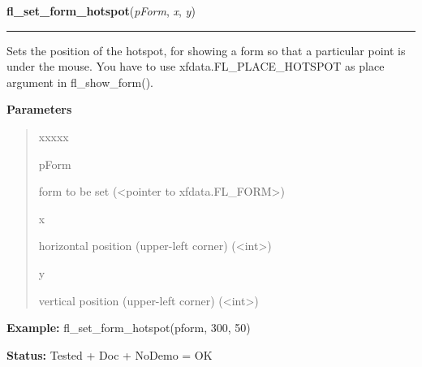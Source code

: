     \vspace{0.5ex}

\hspace{.8\funcindent}\begin{boxedminipage}{\funcwidth}

    \raggedright \textbf{fl\_set\_form\_hotspot}(\textit{pForm}, \textit{x}, \textit{y})

    \vspace{-1.5ex}

    \rule{\textwidth}{0.5\fboxrule}
\setlength{\parskip}{2ex}
    Sets the position of the hotspot, for showing a form so that a 
    particular point is under the mouse. You have to use 
    xfdata.FL\_PLACE\_HOTSPOT as place argument in fl\_show\_form().

\setlength{\parskip}{1ex}
      \textbf{Parameters}
      \vspace{-1ex}

      \begin{quote}
        \begin{Ventry}{xxxxx}

          \item[pForm]

          form to be set ({\textless}pointer to 
          xfdata.FL\_FORM{\textgreater})

          \item[x]

          horizontal position (upper-left corner) 
          ({\textless}int{\textgreater})

          \item[y]

          vertical position (upper-left corner) 
          ({\textless}int{\textgreater})

        \end{Ventry}

      \end{quote}

\textbf{Example:} fl\_set\_form\_hotspot(pform, 300, 50)



\textbf{Status:} Tested + Doc + NoDemo = OK



    \end{boxedminipage}

    \label{xformslib:library:fl_set_form_hotobject}

